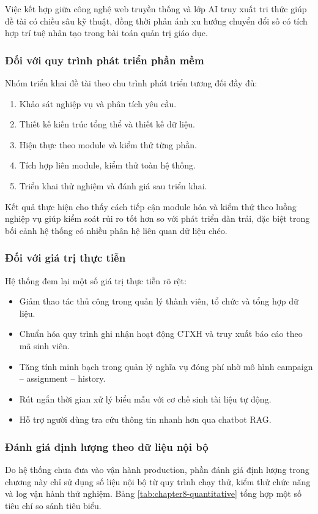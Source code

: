 Việc kết hợp giữa công nghệ web truyền thống và lớp AI truy xuất tri thức giúp đề tài có chiều sâu kỹ thuật, đồng thời phản ánh xu hướng chuyển đổi số có tích hợp trí tuệ nhân tạo trong bài toán quản trị giáo dục.

\subsubsection{Đối với quy trình phát triển phần mềm}
Nhóm triển khai đề tài theo chu trình phát triển tương đối đầy đủ:
\begin{enumerate}
	\item Khảo sát nghiệp vụ và phân tích yêu cầu.
	\item Thiết kế kiến trúc tổng thể và thiết kế dữ liệu.
	\item Hiện thực theo module và kiểm thử từng phần.
	\item Tích hợp liên module, kiểm thử toàn hệ thống.
	\item Triển khai thử nghiệm và đánh giá sau triển khai.
\end{enumerate}

Kết quả thực hiện cho thấy cách tiếp cận module hóa và kiểm thử theo luồng nghiệp vụ giúp kiểm soát rủi ro tốt hơn so với phát triển dàn trải, đặc biệt trong bối cảnh hệ thống có nhiều phân hệ liên quan dữ liệu chéo.

\subsubsection{Đối với giá trị thực tiễn}
Hệ thống đem lại một số giá trị thực tiễn rõ rệt:
\begin{itemize}
	\item Giảm thao tác thủ công trong quản lý thành viên, tổ chức và tổng hợp dữ liệu.
	\item Chuẩn hóa quy trình ghi nhận hoạt động CTXH và truy xuất báo cáo theo mã sinh viên.
	\item Tăng tính minh bạch trong quản lý nghĩa vụ đóng phí nhờ mô hình campaign -- assignment -- history.
	\item Rút ngắn thời gian xử lý biểu mẫu với cơ chế sinh tài liệu tự động.
	\item Hỗ trợ người dùng tra cứu thông tin nhanh hơn qua chatbot RAG.
\end{itemize}

\subsubsection{Đánh giá định lượng theo dữ liệu nội bộ}
Do hệ thống chưa đưa vào vận hành production, phần đánh giá định lượng trong chương này chỉ sử dụng số liệu nội bộ từ quy trình chạy thử, kiểm thử chức năng và log vận hành thử nghiệm. Bảng \ref{tab:chapter8-quantitative} tổng hợp một số tiêu chí so sánh tiêu biểu.

